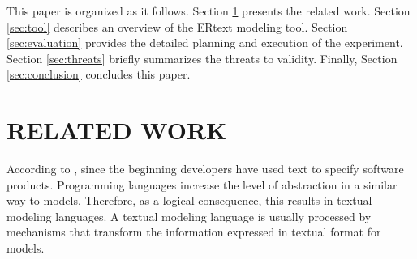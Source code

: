 \documentclass[a4paper,twoside,anonymous]{article}
\begin{document}
This paper is organized as it follows.
Section \ref{sec:relatedWork} presents the related work. 
Section \ref{sec:tool} describes an overview of the ERtext modeling tool. 
Section \ref{sec:evaluation} provides the detailed planning and execution of the experiment. 
Section \ref{sec:threats} briefly summarizes the threats to validity.
Finally, Section \ref{sec:conclusion} concludes this paper.

\section{\uppercase{Related Work}} 
\label{sec:relatedWork}


According to \citet{Brambilla:2017}, since the beginning developers have used text to specify software products.
Programming languages increase the level of abstraction in a similar way to models.
Therefore, as a logical consequence, this results in textual modeling languages.
A textual modeling language is usually processed by mechanisms that transform the information expressed in textual format for models.
\end{document}
